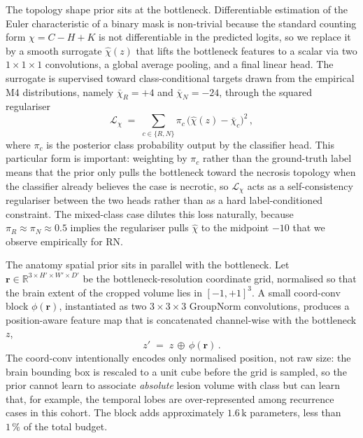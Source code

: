 \documentclass[11pt,a4paper]{article}
\begin{document}
The topology shape prior sits at the bottleneck. Differentiable estimation of the Euler characteristic of a binary mask is non-trivial because the standard counting form $\chi = C - H + K$ is not differentiable in the predicted logits, so we replace it by a smooth surrogate $\hat{\chi}(z)$ that lifts the bottleneck features to a scalar via two $1\times 1\times 1$ convolutions, a global average pooling, and a final linear head. The surrogate is supervised toward class-conditional targets drawn from the empirical M4 distributions, namely $\bar{\chi}_R = +4$ and $\bar{\chi}_N = -24$, through the squared regulariser
\begin{equation}
\mathcal{L}_\chi \;=\; \sum_{c \in \{R, N\}} \pi_c\,\big(\hat{\chi}(z) - \bar{\chi}_c\big)^2 \,,
\label{eq:lchi}
\end{equation}
where $\pi_c$ is the posterior class probability output by the classifier head. This particular form is important: weighting by $\pi_c$ rather than the ground-truth label means that the prior only pulls the bottleneck toward the necrosis topology when the classifier already believes the case is necrotic, so $\mathcal{L}_\chi$ acts as a self-consistency regulariser between the two heads rather than as a hard label-conditioned constraint. The mixed-class case dilutes this loss naturally, because $\pi_R \approx \pi_N \approx 0.5$ implies the regulariser pulls $\hat{\chi}$ to the midpoint $-10$ that we observe empirically for RN.

The anatomy spatial prior sits in parallel with the bottleneck. Let $\mathbf{r}\in\mathbb{R}^{3\times H'\times W'\times D'}$ be the bottleneck-resolution coordinate grid, normalised so that the brain extent of the cropped volume lies in $[-1,+1]^3$. A small coord-conv block $\phi(\mathbf{r})$, instantiated as two $3\times 3\times 3$ GroupNorm convolutions, produces a position-aware feature map that is concatenated channel-wise with the bottleneck $z$,
\begin{equation}
z' \;=\; z \,\oplus\, \phi(\mathbf{r})\,.
\end{equation}
The coord-conv intentionally encodes only normalised position, not raw size: the brain bounding box is rescaled to a unit cube before the grid is sampled, so the prior cannot learn to associate \emph{absolute} lesion volume with class but can learn that, for example, the temporal lobes are over-represented among recurrence cases in this cohort. The block adds approximately $1.6\,\text{k}$ parameters, less than $1\,\%$ of the total budget.
\end{document}
